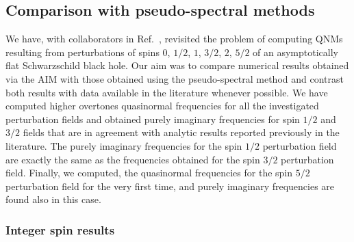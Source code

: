 \subsection{Comparison with pseudo-spectral methods}

We have, with collaborators in Ref.~\cite{Mamani2022}, revisited the problem of computing QNMs resulting from perturbations of spins $0$, $1/2$, $1$, $3/2$, $2$, $5/2$ of an asymptotically flat Schwarzschild black hole. Our aim was to compare numerical results obtained via the AIM with those obtained using the pseudo-spectral method and contrast both results with data available in the literature whenever possible. We have computed higher overtones quasinormal frequencies for all the investigated perturbation fields and obtained  purely imaginary frequencies for spin $1/2$ and $3/2$ fields that are in agreement with analytic results reported previously in the literature. The purely imaginary frequencies for the spin $1/2$ perturbation field are exactly the same as the frequencies obtained for the spin $3/2$ perturbation field. Finally, we computed, the quasinormal frequencies for the spin $5/2$ perturbation field for the very first time, and purely imaginary frequencies are found also in this case.

\subsubsection{Integer spin results}


